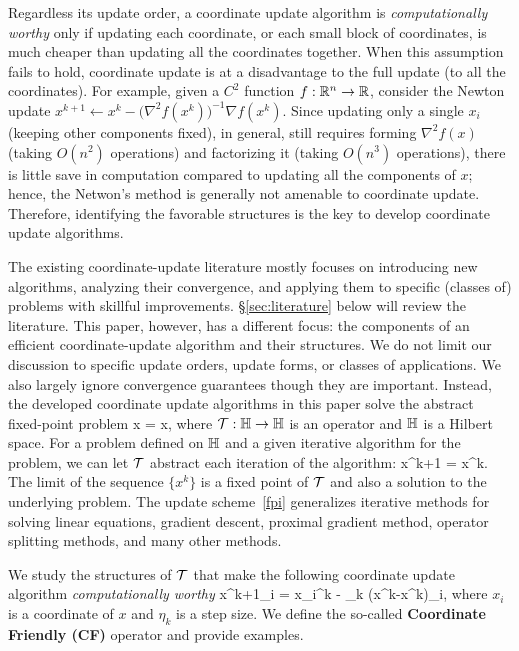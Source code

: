 Regardless its update order, a coordinate update algorithm is \emph{computationally worthy} only if updating each coordinate, or each small block of coordinates, is much cheaper than updating all the coordinates together. When this assumption fails to hold, coordinate update is at a disadvantage to the full update (to all the coordinates). For example, given a $C^2$ function $f:\mathbb{R}^n\to \mathbb{R}$, consider the Newton update  $x^{k+1} \gets x^k - \big(\nabla^2 f(x^k)\big)^{-1}\nabla f(x^k)$. Since updating only a single $x_i$ (keeping other components fixed), in general, still requires forming $\nabla^2 f(x)$ (taking $O(n^2)$ operations) and factorizing it (taking $O(n^3)$ operations), there is little save in computation compared to updating all the components of $x$; hence, the Netwon's method is generally not amenable to coordinate update.  Therefore, identifying the favorable structures is the key to develop coordinate update algorithms.

The existing coordinate-update literature mostly focuses on introducing new algorithms, analyzing their convergence, and applying them to specific (classes of) problems with skillful improvements. \S\ref{sec:literature} below will review the literature. This paper, however, has a different focus:  the  components of  an efficient coordinate-update algorithm and their structures. We do not limit our discussion to specific update orders, update forms,  or classes of applications. We also largely ignore convergence guarantees though they are important. Instead,   
the developed coordinate update algorithms in this paper %
solve the abstract fixed-point problem
\beq\label{fpprob}
x = \cT x,
\eeq
where  ${\mathcal{T}}:\mathbb{H} \to \mathbb{H}$ is an operator and $\mathbb{H}$ is a Hilbert space. 
For a  problem defined on $\mathbb{H}$ and a given iterative algorithm for the problem,  we can let  ${\mathcal{T}}$ abstract each iteration of the algorithm:
\beq\label{fpi}
x^{k+1} = \cT x^k.
\eeq
The limit of the sequence $\{x^k\}$  is a fixed point of ${\mathcal{T}}$ and also a solution to the underlying problem. The update scheme~\eqref{fpi} generalizes iterative methods for solving linear equations, gradient descent, proximal gradient method,  operator splitting methods, and many other methods.

We study the structures of ${\mathcal{T}}$ that make the  following coordinate update algorithm \emph{computationally worthy}
\beq\label{cuitr}
x^{k+1}_i = x_i^k - \eta_k (x^k-\cT x^k)_i,
\eeq
where $x_i$ is a coordinate of $x$ and $\eta_k$ is a  step size. We define the so-called \textbf{Coordinate Friendly (CF)} operator and provide examples. 

